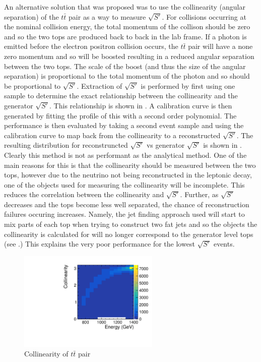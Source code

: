 An alternative solution that was proposed was to use the collinearity (angular separation) of the $t\bar{t}$ pair as a way to measure $\sqrt{S'}$. For collisions occurring at the nominal collision energy, the total momentum of the collison should be zero and so the two tops are produced back to back in the lab frame. If a photon is emitted before the electron positron collision occurs, the $t\bar{t}$ pair will have a none zero momentum and so will be boosted resulting in a reduced angular separation between the two tops. The scale of the boost (and thus the size of the angular separation) is proportional to the total momentum of the photon and so should be proportional to $\sqrt{S'}$. Extraction of $\sqrt{S'}$ is performed by first using one sample to determine the exact relationship between the collinearity and the generator $\sqrt{S'}$. This relationship is shown in . A calibration curve is then generated by fitting the profile of this with a second order polynomial. The performance is then evaluated by taking a second event sample and using the calibration curve to map back from the collinearity to a reconstructed $\sqrt{S'}$. The resulting distribution for reconstruncted $\sqrt{S'}$ vs generator $\sqrt{S'}$ is shown in . Clearly this method is not as performant as the analytical method. One of the main reasons for this is that the collinearity should be measured between the two tops, however due to the neutrino not being reconstructed in the leptonic decay, one of the objects used for measuring the collinearity will be incomplete. This reduces the correlation between the collinearity and $\sqrt{S'}$. Further, as $\sqrt{S'}$ decreases and the tops become less well separated, the chance of reconstruction failures occuring increases. Namely, the jet finding approach used will start to mix parts of each top when trying to construct two fat jets and so the objects the collinearity is calculated for will no longer correspond to the generator level tops (see .) This explains the very poor performance for the lowest $\sqrt{S'}$ events.

\begin{figure}
  \centering
  \includegraphics[width=0.6\textwidth]{TopAnalysis/figures/ColVsE.pdf}
  \caption[Collinearity of $t\bar{t}$ pair]{Collinearity of $t\bar{t}$ pair}
  \label{fig:Collinearity}
\end{figure}

